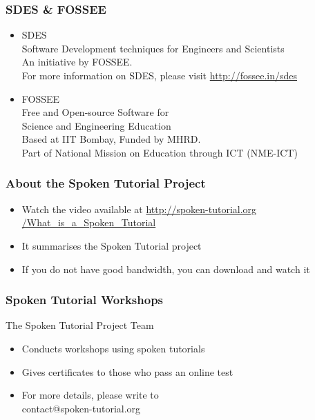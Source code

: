 \documentclass[17pt,compress]{beamer}
\begin{document}
\begin{frame}
\frametitle{SDES \& FOSSEE}
\begin{center}
\begin{itemize}
\item \small{SDES}\\
\small{\color{LimeGreen}Software Development techniques 
    for Engineers and Scientists} \\
\scriptsize An initiative by FOSSEE. \\
\vspace{3pt}
\scriptsize For more information on SDES, please visit 
{\color{blue}\url{http://fossee.in/sdes}}\\
\vspace{12pt}
\item \small{FOSSEE}\\
\small {\color{LimeGreen}Free and Open-source Software for \\
Science and Engineering Education} \\
\scriptsize Based at IIT Bombay, Funded by MHRD.\\
\vspace{3pt}
\scriptsize Part of National Mission on Education through ICT (NME-ICT) \\
\end{itemize}
\end{center}
\end{frame}

\begin{frame}
\frametitle{About the Spoken Tutorial Project}
\begin{itemize}
\item Watch the video available at 
{\color{blue}\url{http://spoken-tutorial.org /What\_is\_a\_Spoken\_Tutorial}} 
\item It summarises the Spoken Tutorial project 
\item If you do not have good bandwidth, you can download and watch it
\end{itemize}
\end{frame}

\begin{frame}
\frametitle{Spoken Tutorial Workshops}The Spoken Tutorial Project Team 
\begin{itemize}
\item Conducts workshops using spoken tutorials 
\item Gives certificates to those who pass an online test 
\item For more details, please write to \\ \hspace {0.5cm}
{\color{blue}contact@spoken-tutorial.org}
\end{itemize}
\end{frame}
\end{document}
